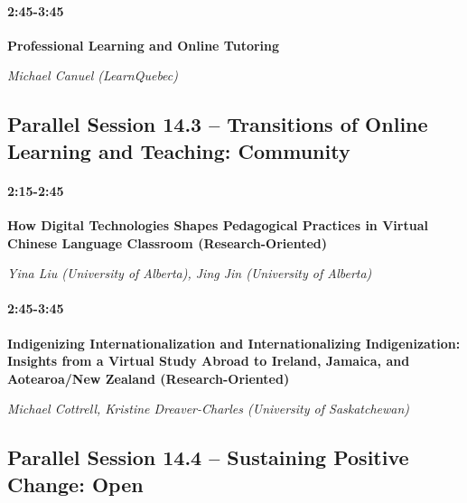 \documentclass[
]{book}
\begin{document}
\begin{secondary}
\hypertarget{section}{%
\paragraph{2:45-3:45}\label{section}}

\textbf{Professional Learning and Online Tutoring}

\emph{Michael Canuel (LearnQuebec)}
\end{secondary}

\hypertarget{parallel-session-14.3-transitions-of-online-learning-and-teaching-community}{%
\subsection*{Parallel Session 14.3 -- Transitions of Online Learning and Teaching: Community}\label{parallel-session-14.3-transitions-of-online-learning-and-teaching-community}}

\begin{secondary}
\hypertarget{section}{%
\paragraph{2:15-2:45}\label{section}}

\textbf{How Digital Technologies Shapes Pedagogical Practices in Virtual
Chinese Language Classroom (Research-Oriented)}

\emph{Yina Liu (University of Alberta), Jing Jin (University of
Alberta)}
\end{secondary}
\begin{secondary}
\hypertarget{section}{%
\paragraph{2:45-3:45}\label{section}}

\textbf{Indigenizing Internationalization and Internationalizing
Indigenization: Insights from a Virtual Study Abroad to Ireland,
Jamaica, and Aotearoa/New Zealand (Research-Oriented)}

\emph{Michael Cottrell, Kristine Dreaver-Charles (University of
Saskatchewan)}
\end{secondary}

\hypertarget{parallel-session-14.4-sustaining-positive-change-open}{%
\subsection*{Parallel Session 14.4 -- Sustaining Positive Change: Open}\label{parallel-session-14.4-sustaining-positive-change-open}}
\end{document}
